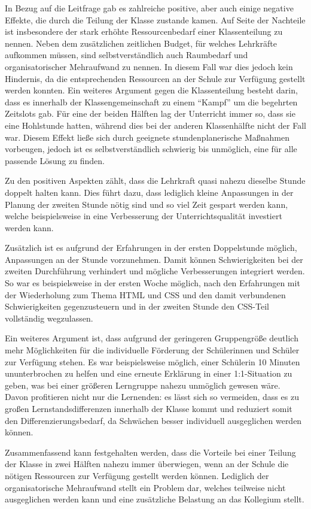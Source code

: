 In Bezug auf die Leitfrage gab es zahlreiche positive, aber auch einige negative Effekte, die durch die Teilung der Klasse zustande kamen.
Auf Seite der Nachteile ist insbesondere der stark erhöhte Ressourcenbedarf einer Klassenteilung zu nennen.
Neben dem zusätzlichen zeitlichen Budget, für welches Lehrkräfte aufkommen müssen, sind selbstverständlich auch Raumbedarf und organisatorischer Mehraufwand zu nennen.
In diesem Fall war dies jedoch kein Hindernis, da die entsprechenden Ressourcen an der Schule zur Verfügung gestellt werden konnten.
Ein weiteres Argument gegen die Klassenteilung besteht darin, dass es innerhalb der Klassengemeinschaft zu einem ``Kampf'' um die begehrten Zeitslots gab.
Für eine der beiden Hälften lag der Unterricht immer so, dass sie eine Hohlstunde hatten, während dies bei der anderen Klassenhälfte nicht der Fall war.
Diesem Effekt ließe sich durch geeignete stundenplanerische Maßnahmen vorbeugen, jedoch ist es selbstverständlich schwierig bis unmöglich, eine für alle passende Lösung zu finden.

Zu den positiven Aspekten zählt, dass die Lehrkraft quasi nahezu dieselbe Stunde doppelt halten kann.
Dies führt dazu, dass lediglich kleine Anpassungen in der Planung der zweiten Stunde nötig sind und so viel Zeit gespart werden kann, welche beispielsweise in eine Verbesserung der Unterrichtsqualität investiert werden kann.

Zusätzlich ist es aufgrund der Erfahrungen in der ersten Doppelstunde möglich, Anpassungen an der Stunde vorzunehmen.
Damit können Schwierigkeiten bei der zweiten Durchführung verhindert und mögliche Verbesserungen integriert werden.
So war es beispielsweise in der ersten Woche möglich, nach den Erfahrungen mit der Wiederholung zum Thema HTML und CSS und den damit verbundenen Schwierigkeiten gegenzusteuern und in der zweiten Stunde den CSS-Teil vollständig wegzulassen.

Ein weiteres Argument ist, dass aufgrund der geringeren Gruppengröße deutlich mehr Möglichkeiten für die individuelle Förderung der Schülerinnen und Schüler zur Verfügung stehen.
Es war beispielsweise möglich, einer Schülerin 10 Minuten ununterbrochen zu helfen und eine erneute Erklärung in einer 1:1-Situation zu geben, was bei einer größeren Lerngruppe nahezu unmöglich gewesen wäre.
Davon profitieren nicht nur die Lernenden: es lässt sich so vermeiden, dass es zu großen Lernstandsdifferenzen innerhalb der Klasse kommt und reduziert somit den Differenzierungsbedarf, da Schwächen besser individuell ausgeglichen werden können.

Zusammenfassend kann festgehalten werden, dass die Vorteile bei einer Teilung der Klasse in zwei Hälften nahezu immer überwiegen, wenn an der Schule die nötigen Ressourcen zur Verfügung gestellt werden können.
Lediglich der organisatorische Mehraufwand stellt ein Problem dar, welches teilweise nicht ausgeglichen werden kann und eine zusätzliche Belastung an das Kollegium stellt.